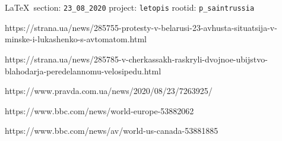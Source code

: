  
 

\section{}
\label{sec:23_08_2020}

\vspace{0.5cm}
 {\ifDEBUG\small\LaTeX~section: \verb|23_08_2020| project: \verb|letopis| rootid: \verb|p_saintrussia| \fi}
\vspace{0.5cm}

https://strana.ua/news/285755-protesty-v-belarusi-23-avhusta-situatsija-v-minske-i-lukashenko-s-avtomatom.html

https://strana.ua/news/285785-v-cherkassakh-raskryli-dvojnoe-ubijstvo-blahodarja-peredelannomu-velosipedu.html

https://www.pravda.com.ua/news/2020/08/23/7263925/

https://www.bbc.com/news/world-europe-53882062

https://www.bbc.com/news/av/world-us-canada-53881885
  
